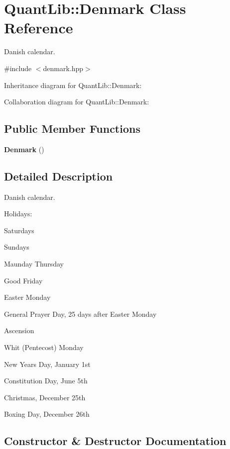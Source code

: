 \section{Quant\+Lib\+:\+:Denmark Class Reference}
\label{class_quant_lib_1_1_denmark}


Danish calendar.  




{\ttfamily \#include $<$denmark.\+hpp$>$}



Inheritance diagram for Quant\+Lib\+:\+:Denmark\+:


Collaboration diagram for Quant\+Lib\+:\+:Denmark\+:
\subsection*{Public Member Functions}
\begin{DoxyCompactItemize}
\item 
{\bf Denmark} ()
\end{DoxyCompactItemize}


\subsection{Detailed Description}
Danish calendar. 

Holidays\+: 
\begin{DoxyItemize}
\item Saturdays 
\item Sundays 
\item Maunday Thursday 
\item Good Friday 
\item Easter Monday 
\item General Prayer Day, 25 days after Easter Monday 
\item Ascension 
\item Whit (Pentecost) Monday  
\item New Year\textquotesingle{}s Day, January 1st 
\item Constitution Day, June 5th 
\item Christmas, December 25th 
\item Boxing Day, December 26th 
\end{DoxyItemize}

\subsection{Constructor \& Destructor Documentation}
